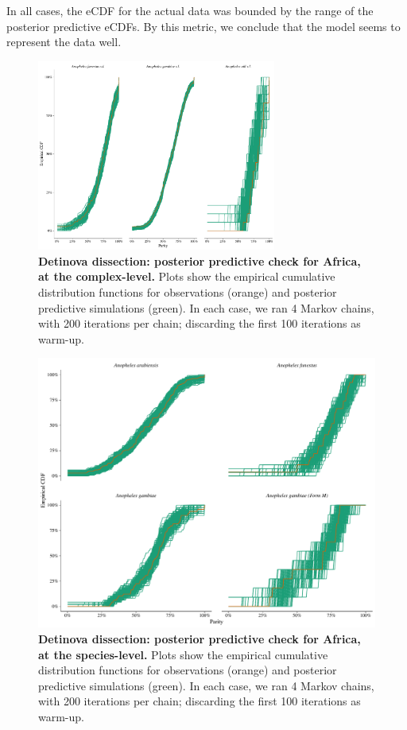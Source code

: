 \documentclass[12pt]{article}
\begin{document}
{In all cases, the eCDF for the actual data was bounded by the range of the posterior predictive eCDFs. By this metric, we conclude that the model seems to represent the data well.

\begin{figure}[ht]
	\centerline{\includegraphics[width=0.7\textwidth]{./Figure_files/detinova_ecdf_africa_grouped.pdf}}
	\caption{\textbf{Detinova dissection: posterior predictive check for Africa, at the complex-level.} Plots show the empirical cumulative distribution functions for observations (orange) and posterior predictive simulations (green). In each case, we ran 4 Markov chains, with 200 iterations per chain; discarding the first 100 iterations as warm-up.}\label{fig:detinova_ecdf_africa_grouped}
\end{figure}

\begin{figure}[ht]
	\centerline{\includegraphics[width=1\textwidth]{./Figure_files/detinova_ecdf_africa_species.pdf}}
	\caption{\textbf{Detinova dissection: posterior predictive check for Africa, at the species-level.} Plots show the empirical cumulative distribution functions for observations (orange) and posterior predictive simulations (green). In each case, we ran 4 Markov chains, with 200 iterations per chain; discarding the first 100 iterations as warm-up.}\label{fig:detinova_ecdf_africa_species}
\end{figure}

}
\end{document}
